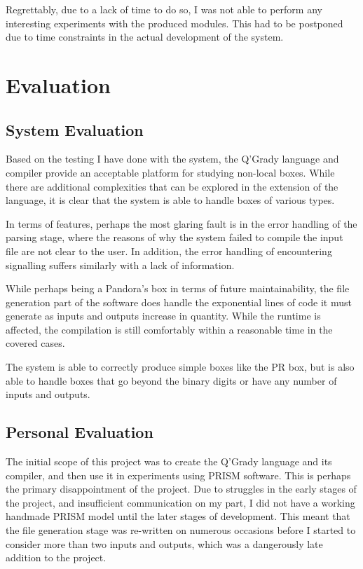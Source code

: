 \documentclass[report.tex]{subfiles}
\begin{document}
Regrettably, due to a lack of time to do so, I was not able to perform any
interesting experiments with the produced modules. This had to be postponed
due to time constraints in the actual development of the system.

\section{Evaluation} %
\label{sec:evaluation}
\subsection{System Evaluation} %
\label{sub:system_evaluation}
Based on the testing I have done with the system, the Q'Grady language and
compiler provide an acceptable platform for studying non-local boxes. While
there are additional complexities that can be explored in the extension of the
language, it is clear that the system is able to handle boxes of various types.

In terms of features, perhaps the most glaring fault is in the error handling of
the parsing stage, where the reasons of why the system failed to compile the
input file are not clear to the user. In addition, the error handling of
encountering signalling suffers similarly with a lack of information.

While perhaps being a Pandora's box in terms of future maintainability, the file
generation part of the software does handle the exponential lines of code it
must generate as inputs and outputs increase in quantity. While the runtime is
affected, the compilation is still comfortably within a reasonable time in the
covered cases.

The system is able to correctly produce simple boxes like the PR box, but is
also able to handle boxes that go beyond the binary digits or have any number
of inputs and outputs.

\subsection{Personal Evaluation} %
\label{sub:personal_evaluation}
The initial scope of this project was to create the Q'Grady language and its
compiler, and then use it in experiments using PRISM software. This is perhaps
the primary disappointment of the project. Due to struggles in the early stages
of the project, and insufficient communication on my part, I did not have a
working handmade PRISM model until the later stages of development. This meant
that the file generation stage was re-written on numerous occasions before I
started to consider more than two inputs and outputs, which was a dangerously
late addition to the project.
\end{document}
